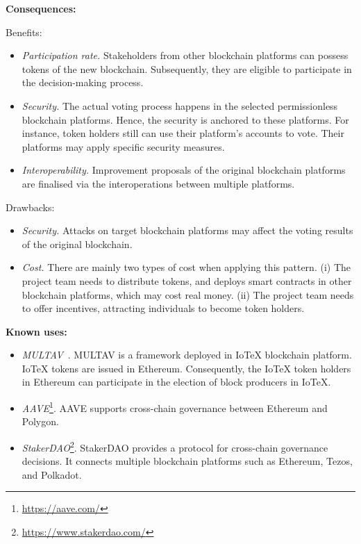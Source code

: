 \documentclass{article}
\begin{document}
\vspace{0.5em}\noindent \textbf{Consequences:} 

Benefits:
\begin{itemize}
  \item \textit{Participation rate.} Stakeholders from other blockchain platforms can possess tokens of the new blockchain. Subsequently, they are eligible to participate in the decision-making process.

  \item \textit{Security.} The actual voting process happens in the selected permissionless blockchain platforms. Hence, the security is anchored to these platforms. For instance, token holders still can use their platform's accounts to vote. Their platforms may apply specific security measures.

  
  \item \textit{Interoperability.} Improvement proposals of the original blockchain platforms are finalised via the interoperations between multiple platforms.
\end{itemize}

Drawbacks: 
\begin{itemize}
   \item \textit{Security.} Attacks on target blockchain platforms may affect the voting results of the original blockchain.
   
   \item \textit{Cost.} There are mainly two types of cost when applying this pattern. (i) The project team needs to distribute tokens, and deploys smart contracts in other blockchain platforms, which may cost real money. (ii) The project team needs to offer incentives, attracting individuals to become token holders.
\end{itemize}



\vspace{0.5em}\noindent \textbf{Known uses:}  
 \begin{itemize}
   \item \textit{MULTAV}~\cite{MULTAV}. MULTAV is a framework deployed in IoTeX blockchain platform. IoTeX tokens are issued in Ethereum. Consequently, the IoTeX token holders in Ethereum can participate in the election of block producers in IoTeX.
   
   \item \textit{AAVE}\footnote{\url{https://aave.com/}}. AAVE supports cross-chain governance between Ethereum and Polygon.
   
   \item \textit{StakerDAO}\footnote{\url{https://www.stakerdao.com/}}. StakerDAO provides a protocol for cross-chain governance decisions. It connects multiple blockchain platforms such as Ethereum, Tezos, and Polkadot.
 \end{itemize}
\end{document}
